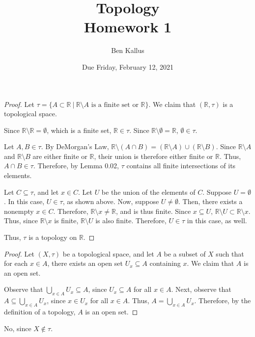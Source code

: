 \documentclass{article}
\date{Due Friday, February 12, 2021}
\author{Ben Kallus}
\title{Topology \\ Homework 1}
\newcommand{\R}{\mathbb R}
\begin{document}
\pagecolor{black}
\color{white}
\maketitle

\begin{proof}
    Let $\tau = \{A \subset \R~|~\R \setminus A \text{ is a finite set or } \R\}$.
    We claim that $(\R, \tau)$ is a topological space.

    Since $\R \setminus \R = \emptyset$, which is a finite set, $\R \in \tau$.
    Since $\R \setminus \emptyset = \R$, $\emptyset \in \tau$.

    Let $A,B \in \tau$.
    By DeMorgan's Law, $\R \setminus (A \cap B) = (\R \setminus A) \cup (\R \setminus B)$.
    Since $\R \setminus A$ and $\R \setminus B$ are either finite or $\R$, their union is therefore either finite or $\R$.
    Thus, $A \cap B \in \tau$.
    Therefore, by Lemma 0.02, $\tau$ contains all finite intersections of its elements.
    
    Let $C \subseteq \tau$, and let $x \in C$.
    Let $U$ be the union of the elements of $C$.
    Suppose $U = \emptyset$.
    In this case, $U \in \tau$, as shown above.
    Now, suppose $U \neq \emptyset$.
    Then, there exists a nonempty $x \in C$.
    Therefore, $\R \setminus x \neq \R$, and is thus finite.
    Since $x \subseteq U$, $\R \setminus U \subset \R \setminus x$.
    Thus, since $\R \setminus x$ is finite, $\R \setminus U$ is also finite.
    Therefore, $U \in \tau$ in this case, as well.

    Thus, $\tau$ is a topology on $\R$.
\end{proof}

\bigskip
{}
\begin{proof}
    Let $(X, \tau)$ be a topological space, and let $A$ be a subset of $X$ such that for each $x \in A$, there exists an open set $U_x \subseteq A$ containing $x$.
    We claim that $A$ is an open set.

    Observe that $\bigcup\limits_{x \in A} U_x \subseteq A$, since $U_x \subseteq A$ for all $x \in A$.
    Next, observe that $A \subseteq \bigcup\limits_{x \in A} U_x$, since $x \in U_x$ for all $x \in A$.
    Thus, $A = \bigcup\limits_{x \in A} U_x$.
    Therefore, by the definition of a topology, $A$ is an open set.
\end{proof}

\bigskip
{} No, since $X \notin \tau$.
\end{document}

